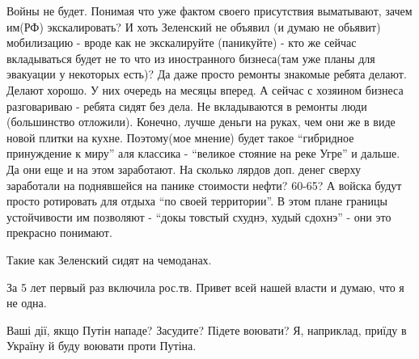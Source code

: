 \begin{itemize}
Войны не будет. Понимая что уже фактом своего присутствия выматывают, зачем
им(РФ) экскалировать? И хоть Зеленский не объявил (и думаю не обьявит)
мобилизацию - вроде как не экскалируйте (паникуйте) - кто же сейчас вкладываться
будет не то что из иностранного бизнеса(там уже планы для эвакуации у некоторых
есть)? Да даже просто ремонты знакомые ребята делают. Делают хорошо. У них
очередь на месяцы вперед. А сейчас с хозяином бизнеса разговариваю - ребята
сидят без дела. Не вкладываются в ремонты люди (большинство отложили). Конечно,
лучше деньги на руках, чем они же в виде новой плитки на кухне. Поэтому(мое
мнение) будет такое \enquote{гибридное принуждение к миру} аля классика - \enquote{великое
стояние на реке Угре} и дальше. Да они еще и на этом заработают. На сколько
лярдов доп. денег сверху заработали на поднявшейся на панике стоимости нефти?
60-65? А войска будут просто ротировать для отдыха \enquote{по своей территории}. В
этом плане границы устойчивости им позволяют - \enquote{докы товстый схуднэ, худый
сдохнэ} - они это прекрасно понимают.

Такие как Зеленский сидят на чемоданах.


За 5 лет первый раз включила рос.тв. Привет всей нашей власти и думаю, что я не одна.


Ваші дії, якщо Путін нападе? Засудите? Підете воювати? Я, наприклад, приїду в
Україну й буду воювати проти Путіна.
\end{itemize} %
